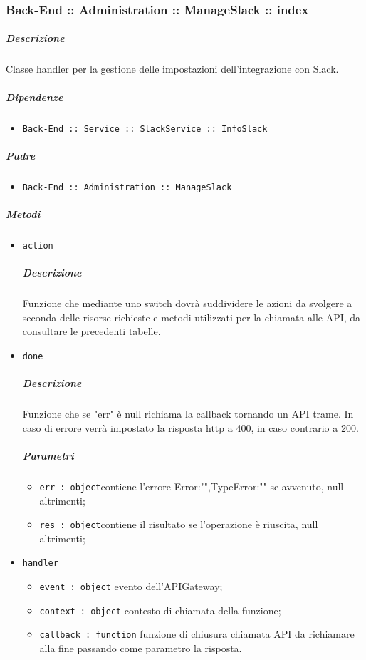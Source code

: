 \documentclass[../ManualeSviluppatore_v2.0.0.tex]{subfiles}
\begin{document}
\subsubsection{Back-End :: Administration :: ManageSlack :: index}
\subparagraph{Descrizione} Classe handler per la gestione delle impostazioni dell'integrazione con Slack.
\subparagraph{Dipendenze}
\begin{itemize}
	\item \texttt{Back-End :: Service :: SlackService :: InfoSlack}
\end{itemize}
\subparagraph{Padre}
\begin{itemize}
	\item \texttt{Back-End :: Administration :: ManageSlack}
\end{itemize}
\subparagraph{Metodi}
\begin{itemize}
	\item \texttt{action}
	      \subparagraph{Descrizione} Funzione che mediante uno switch dovrà suddividere le azioni da svolgere a seconda delle risorse richieste e metodi utilizzati per la chiamata alle API, da consultare le precedenti tabelle.
	\item \texttt{done}
	      \subparagraph{Descrizione} Funzione che se "err" è null richiama la callback tornando un API trame. In caso di errore verrà impostato la risposta http a 400, in caso contrario a 200.
	      \subparagraph{Parametri}
	      \begin{itemize}
	      	\item \texttt{err : object}contiene l'errore {Error:"",TypeError:""} se avvenuto, null altrimenti;
	      	\item \texttt{res : object}contiene il risultato se l'operazione è riuscita, null altrimenti;
	      \end{itemize}
	\item \texttt{handler}
	      \begin{itemize}
	      	\item \texttt{event : object} evento dell'APIGateway;
	      	\item \texttt{context : object} contesto di chiamata della funzione;
	      	\item \texttt{callback : function} funzione di chiusura chiamata API da richiamare alla fine passando come parametro la risposta.
	      \end{itemize}
\end{itemize}
\end{document}
